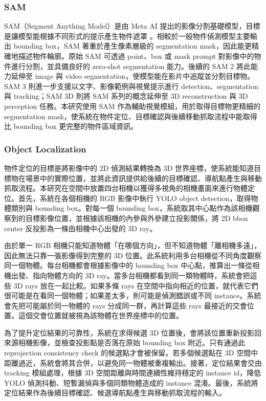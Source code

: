 \documentclass[12pt,a4paper]{article}
\begin{document}
\subsubsection{SAM}

SAM（Segment Anything Model）是由 Meta AI 提出的影像分割基礎模型，目標是讓模型能根據不同形式的提示產生物件遮罩 \cite{sam}。相較於一般物件偵測模型主要輸出 bounding box，SAM 著重於產生像素層級的 segmentation mask，因此能更精確地描述物件輪廓。原始 SAM 可透過 point、box 或 mask prompt 對影像中的物件進行分割，並具備良好的 zero-shot segmentation 能力。後續的 SAM 2 將此能力延伸至 image 與 video segmentation，使模型能在影片中追蹤並分割目標物。SAM 3 則進一步支援以文字、影像範例與視覺提示進行 detection、segmentation 與 tracking；SAM 3D 則將 SAM 系列的概念延伸至 3D reconstruction 與 3D perception 任務。本研究使用 SAM 作為輔助視覺模組，用於取得目標物更精細的 segmentation mask，使系統在物件定位、目標確認與後續移動抓取流程中能取得比 bounding box 更完整的物件區域資訊。

\subsubsection{Object Localization}

物件定位的目標是將影像中的 2D 偵測結果轉換為 3D 世界座標，使系統能知道目標物在場景中的實際位置，並將此資訊提供給後續的目標確認、導航點產生與移動抓取流程。本研究在空間中放置四台相機以獲得多視角的相機畫面來進行物體定位。首先，系統在各個相機的 RGB 影像中執行 YOLO object detection，取得物體類別與 bounding box。對每一個 bounding box，系統取其中心點作為該相機觀察到的目標影像位置，並根據該相機的內參與外參建立投影關係，將 2D bbox center 反投影為一條由相機中心出發的 3D ray。

由於單一 RGB 相機只能知道物體「在哪個方向」，但不知道物體「離相機多遠」，因此無法只靠一張影像得到完整的 3D 位置。此系統利用多台相機從不同角度觀察同一個物體。每台相機都會根據影像中的 bounding box 中心點，推算出一條從相機出發、指向物體方向的 3D ray。當多台相機都看到同一類物體時，系統會把這些 3D rays 放在一起比較。如果多條 rays 在空間中指向相近的位置，就代表它們很可能是在看同一個物體；如果差太多，則可能是偵測錯誤或不同 instance。系統會先把可能屬於同一物體的 rays 分成同一群，再計算這些 rays 最接近的交會位置。這個交會位置就被視為該物體在世界座標中的位置。

為了提升定位結果的可靠性，系統在求得候選 3D 位置後，會將該位置重新投影回來源相機影像，並檢查投影點是否落在原始 bounding box 附近。只有通過此 reprojection consistency check 的候選點才會被保留。若多個候選點在 3D 空間中距離過近，系統會將其合併，以避免同一物體被重複輸出。接著，定位結果會交由 tracking 模組處理，根據 3D 空間距離與時間連續性維持穩定的 instance id，降低 YOLO 偵測抖動、短暫漏偵與多個同類物體造成的 instance 混淆。最後，系統將定位結果作為後續目標確認、候選導航點產生與移動抓取流程的輸入。
\end{document}
